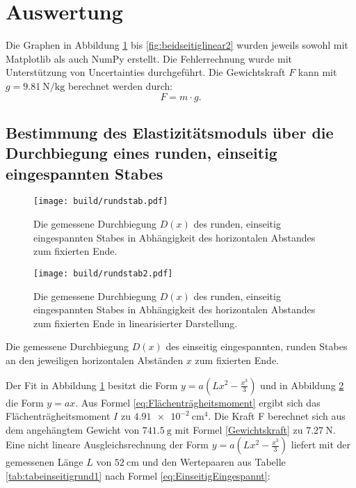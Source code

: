 
\section{Auswertung}
\label{sec:Auswertung}
Die Graphen in Abbildung \ref{fig:rund} bis \ref{fig:beidseitiglinear2} wurden
 jeweils sowohl mit Matplotlib \cite{matplotlib} als auch NumPy \cite{numpy} erstellt.
  Die Fehlerrechnung wurde mit Unterstützung von Uncertainties \cite{uncertainties}
	 durchgeführt. Die Gewichtskraft $F$ kann mit $g=\SI{9.81}{\newton\per\kilogram}$ \cite{g} berechnet werden durch:
\begin{equation}
	F = m \cdot g \text{.} \label{Gewichtskraft}
\end{equation}

\subsection{Bestimmung des Elastizitätsmoduls über die Durchbiegung eines runden, einseitig eingespannten Stabes}
\begin{figure}
	\centering
	\caption{Die gemessene Durchbiegung $D(x)$ des runden, einseitig eingespannten Stabes
	 in Abhängigkeit des horizontalen Abstandes zum fixierten Ende.}
	\texttt{[image: build/rundstab.pdf]}
	\label{fig:rund}
\end{figure}
\begin{figure}
	\centering
	\caption{Die gemessene Durchbiegung $D(x)$ des runden, einseitig eingespannten Stabes
	 in Abhängigkeit des horizontalen Abstandes zum fixierten Ende in linearisierter Darstellung.}
	\texttt{[image: build/rundstab2.pdf]}
	\label{fig:rundlinear}
\end{figure}
\begin{table}
	\caption{Die gemessene Durchbiegung $D(x)$ des einseitig eingespannten, runden Stabes an den jeweiligen horizontalen Abständen $x$ zum fixierten Ende.}
	\begin{minipage}{0.5\textwidth}
		\centering
		
	\end{minipage}
	\begin{minipage}{0.5\textwidth}
		\centering
		
	\end{minipage}
\end{table}
Der Fit in Abbildung \ref{fig:rund} besitzt die Form $y = a ( L x^2 - \frac{x^3}{3} ) $ und in Abbildung \ref{fig:rundlinear} die Form $y=a x$. Aus Formel \eqref{eq:Flächenträgheitsmoment} ergibt sich das Flächenträgheitsmoment $I$ zu $\SI{4.91e-2}{\centi\meter\tothe{4}}$. Die Kraft F berechnet sich aus dem angehängtem Gewicht von $\SI{741.5}{\gram}$ mit Formel \eqref{Gewichtskraft} zu $\SI{7.27}{\newton}$. Eine nicht lineare Ausgleichsrechnung der Form $y = a ( L x^2 - \frac{x^3}{3})$ liefert mit der gemessenen Länge $L$ von $\SI{52}{\centi\meter}$ und den Wertepaaren aus Tabelle \ref{tab:tabeinseitigrund1} nach Formel \eqref{eq:EinseitigEingespannt}:
